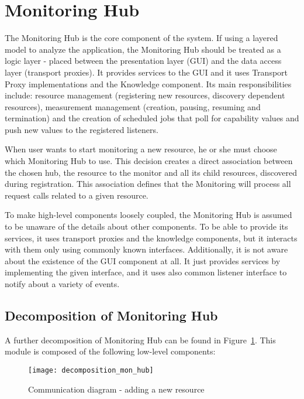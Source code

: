 %
\section{Monitoring Hub}
\label{sec:arch_monitoring_hub}

The Monitoring Hub is the core component of the system. If using a layered model to analyze the application, the Monitoring Hub should be treated as a logic layer - placed between the presentation layer (GUI) and the data access layer (transport proxies). It provides services to the GUI and it uses Transport Proxy implementations and the Knowledge component. Its main responsibilities include: resource management (registering new resources, discovery dependent resources), measurement management (creation, pausing, resuming and termination) and the creation of scheduled jobs that poll for capability values and push new values to the registered listeners.

When user wants to start monitoring a new resource, he or she must choose which Monitoring Hub to use. This decision creates a direct association between the chosen hub, the resource to the monitor and all its child resources, discovered during registration. This association defines that the Monitoring will process all request calls related to a given resource.

To make high-level components loosely coupled, the Monitoring Hub is assumed to be unaware of the details about other components. To be able to provide its services, it uses transport proxies and the knowledge components, but it interacts with them only using commonly known interfaces. Additionally, it is not aware about the existence of the GUI component at all. It just provides services by implementing the given interface, and it uses also common listener interface to notify about a variety of events.


\subsection{Decomposition of Monitoring Hub}

A further decomposition of Monitoring Hub can be found in Figure~\ref{fig:decomposition_mon_hub}. This module is composed of the following low-level components:

\begin{figure}[ht]
\centering
\texttt{[image: decomposition\_mon\_hub]}
\caption{Communication diagram - adding a new resource}
\label{fig:decomposition_mon_hub}
\end{figure}

